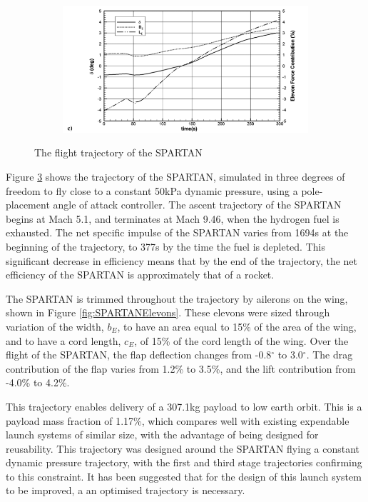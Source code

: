 \begin{figure}[ht]
\begin{subfigure}{.8\textwidth}
		\label{fig:SPARTAN_traj2}
	\end{subfigure}
	\begin{subfigure}{.8\textwidth}
		\centering
		\includegraphics[width=0.99\linewidth]{figures/2_literature-review/SPARTAN_traj3}

		\label{fig:SPARTAN_traj3}
	\end{subfigure}
	\caption{The flight trajectory of the SPARTAN}
	\label{fig:SPARTAN_traj}
\end{figure}
	
Figure \ref{fig:SPARTAN_traj} shows the trajectory of the SPARTAN, simulated in three degrees of freedom to fly close to a constant 50kPa dynamic pressure, using a pole-placement angle of attack controller\cite{Preller2017}.
The ascent trajectory of the SPARTAN begins at Mach 5.1, and terminates at Mach 9.46, when the hydrogen fuel is exhausted\cite{Preller2017}. 
The net specific impulse of the SPARTAN varies from 1694s at the beginning of the trajectory, to 377s by the time the fuel is depleted\cite{Preller2017}. This significant decrease in efficiency means that by the end of the trajectory, the net efficiency of the SPARTAN is approximately that of a rocket\cite{Preller2017}.

The SPARTAN is trimmed throughout the trajectory by ailerons on the wing, shown in Figure \ref{fig:SPARTANElevons}. These elevons were sized through variation of the width, $b_E$, to have an area equal to 15\% of the area of the wing, and to have a cord length, $c_E$, of 15\% of the cord length of the wing\cite{Preller2017}. Over the flight of the SPARTAN, the flap deflection changes from -0.8$^\circ$ to 3.0$^\circ$\cite{Preller2017}. The drag contribution of the flap varies from 1.2\% to 3.5\%, and the lift contribution from -4.0\% to 4.2\%\cite{Preller2017}. 

 This trajectory enables delivery of a 307.1kg payload to low earth orbit\cite{Preller2017}. This is a payload mass fraction of 1.17\%, which compares well with existing expendable launch systems of similar size, with the advantage of being designed for reusability\cite{Preller2017}. 
This trajectory was designed around the SPARTAN flying a constant dynamic pressure trajectory, with the first and third stage trajectories confirming to this constraint. It has been suggested that for the design of this launch system to be improved, a an optimised trajectory is necessary\cite{Preller2017}.




